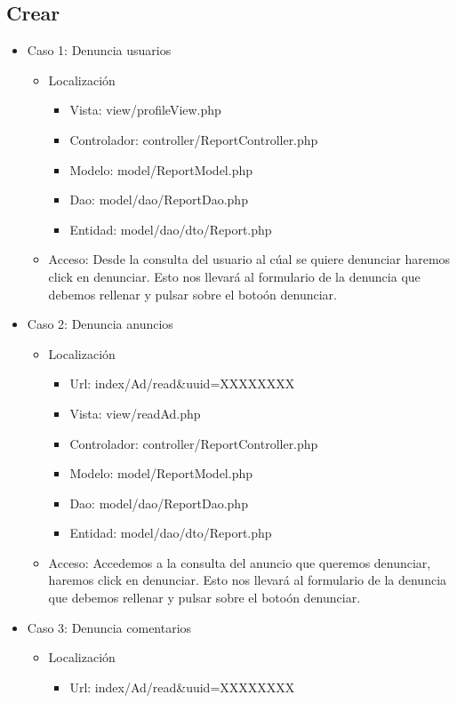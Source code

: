 \subsection{Crear}
\begin{itemize}
\item Caso 1: Denuncia usuarios
\begin{itemize}
\item Localizaci\'{o}n
\begin{itemize}
\item Vista: view/profileView.php
\item Controlador: controller/ReportController.php
\item Modelo: model/ReportModel.php
\item Dao: model/dao/ReportDao.php
\item Entidad: model/dao/dto/Report.php
\end{itemize}
\item Acceso: Desde la consulta del usuario al c\'{u}al se quiere denunciar haremos click en denunciar. Esto nos llevar\'{a} al formulario de la denuncia que debemos rellenar y pulsar sobre el boto\'{o}n denunciar.
\end{itemize}
\item Caso 2: Denuncia anuncios
\begin{itemize}
\item Localizaci\'{o}n
\begin{itemize}
\item Url: index/Ad/read\&uuid=XXXXXXXX
\item Vista: view/readAd.php
\item Controlador: controller/ReportController.php
\item Modelo: model/ReportModel.php
\item Dao: model/dao/ReportDao.php
\item Entidad: model/dao/dto/Report.php
\end{itemize}
\item Acceso: Accedemos a la consulta del anuncio que queremos denunciar, haremos click en denunciar. Esto nos llevar\'{a} al formulario de la denuncia que debemos rellenar y pulsar sobre el boto\'{o}n denunciar. 
\end{itemize}
\item Caso 3: Denuncia comentarios
\begin{itemize}
\item Localizaci\'{o}n
\begin{itemize}
\item Url: index/Ad/read\&uuid=XXXXXXXX

\end{itemize}
\end{itemize}
\end{itemize}

